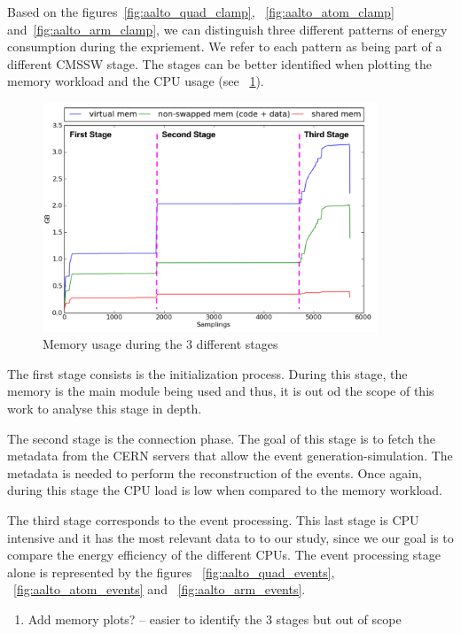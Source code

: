 Based on the figures~\ref{fig:aalto_quad_clamp}, ~\ref{fig:aalto_atom_clamp} 
and~\ref{fig:aalto_arm_clamp}, we can distinguish three different patterns of energy consumption during the expriement. 
We refer to each pattern as being part of a different CMSSW stage. The stages can be better identified 
when plotting the memory workload and the CPU usage (see ~\ref{fig:memory_stages}).

\begin{figure}[h]
  \centering
    \includegraphics[width=100mm]{"img/aalto/memory_stages"}
    \caption{Memory usage during the 3 different stages}
    \label{fig:memory_stages}
\end{figure}

The first stage consists is the initialization process. During this stage, the memory is the main module being used and thus, it is out od the scope of this work to analyse this stage in depth. 

The second stage is the connection phase. The goal of this stage is to fetch the metadata from
the CERN servers that allow the event generation-simulation. The metadata is needed to perform the reconstruction of the events. Once again, 
during this stage the CPU load is low when compared to the memory workload. 

The third stage corresponds to the event processing. This last stage is CPU intensive and it has the most relevant data to to our study, since we our goal is to compare the energy efficiency of the different CPUs. The event processing stage alone is represented by 
the figures ~\ref{fig:aalto_quad_events}, ~\ref{fig:aalto_atom_events} and ~\ref{fig:aalto_arm_events}.

\begin{enumerate}
\item Add memory plots? -- easier to identify the 3 stages but out of scope
\end{enumerate}

